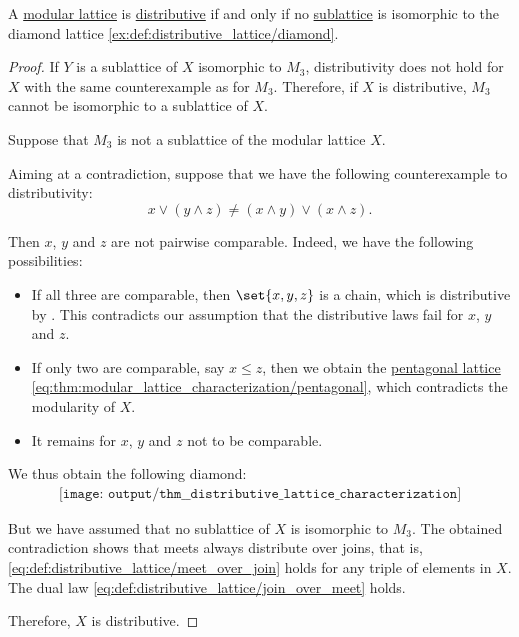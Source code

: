 \begin{proposition}\label{thm:distributive_modular_lattice_characterization}
  A \hyperref[def:modular_lattice]{modular lattice} is \hyperref[def:modular_lattice]{distributive} if and only if no \hyperref[def:lattice/submodel]{sublattice} is isomorphic to the diamond lattice \eqref{ex:def:distributive_lattice/diamond}.
\end{proposition}
\begin{proof}
  \SufficiencySubProof If \( Y \) is a sublattice of \( X \) isomorphic to \( M_3 \), distributivity does not hold for \( X \) with the same counterexample  as for \( M_3 \). Therefore, if \( X \) is distributive, \( M_3 \) cannot be isomorphic to a sublattice of \( X \).

  \NecessitySubProof Suppose that \( M_3 \) is not a sublattice of the modular lattice \( X \).

  Aiming at a contradiction, suppose that we have the following counterexample to distributivity:
  \begin{equation*}
    x \vee (y \wedge z) \neq (x \wedge y) \vee (x \wedge z).
  \end{equation*}

  Then \( x \), \( y \) and \( z \) are not pairwise comparable. Indeed, we have the following possibilities:
  \begin{itemize}
    \item If all three are comparable, then \( \set{ x, y, z } \) is a chain, which is distributive by . This contradicts our assumption that the distributive laws fail for \( x \), \( y \) and \( z \).

    \item If only two are comparable, say \( x \leq z \), then we obtain the \hyperref[ex:def:modular_lattice/pentagon]{pentagonal lattice} \eqref{eq:thm:modular_lattice_characterization/pentagonal}, which contradicts the modularity of \( X \).

    \item It remains for \( x \), \( y \) and \( z \) not to be comparable.
  \end{itemize}

  We thus obtain the following diamond:
  \begin{equation}\label{eq:thm:distributive_lattice_characterization/diamond}
    \begin{aligned}
      \texttt{[image: output/thm\_\_distributive\_lattice\_characterization]}
    \end{aligned}
  \end{equation}

  But we have assumed that no sublattice of \( X \) is isomorphic to \( M_3 \). The obtained contradiction shows that meets always distribute over joins, that is, \eqref{eq:def:distributive_lattice/meet_over_join} holds for any triple of elements in \( X \). The dual law \eqref{eq:def:distributive_lattice/join_over_meet} holds.

  Therefore, \( X \) is distributive.
\end{proof}

